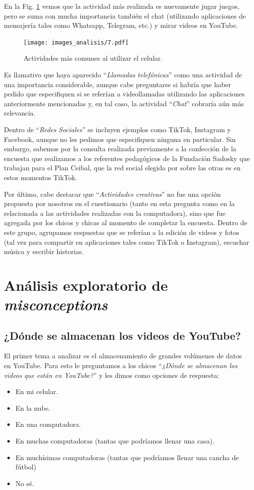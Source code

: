 En la Fig. \ref{fig:analisis7} vemos que la actividad más realizada es nuevamente jugar juegos, pero se suma con mucha importancia también el chat (utilizando aplicaciones de mensajería tales como Whatsapp, Telegram, etc.) y mirar videos en YouTube.

\begin{figure}[h]
    \centering
    \texttt{[image: images\_analisis/7.pdf]}
    \caption{Actividades más comunes al utilizar el celular.}
    \label{fig:analisis7}
\end{figure}


Es llamativo que haya aparecido ``\textit{Llamadas telefónicas}'' como una actividad de una importancia considerable, aunque cabe preguntarse si habría que haber pedido que especifiquen si se referían a videollamadas utilizando las aplicaciones anteriormente mencionadas y, en tal caso, la actividad ``\textit{Chat}'' cobraría aún más relevancia.

Dentro de ``\textit{Redes Sociales}'' se incluyen ejemplos como TikTok, Instagram y Facebook, aunque no les pedimos que especifiquen ninguna en particular. Sin embargo, sabemos por la consulta realizada previamente a la confección de la encuesta que realizamos a los referentes pedagógicos de la Fundación Sadosky que trabajan para el Plan Ceibal, que la red social elegida por sobre las otras es en estos momentos TikTok.

Por último, cabe destacar que ``\textit{Actividades creativas}'' no fue una opción propuesta por nosotros en el cuestionario (tanto en esta pregunta como en la relacionada a las actividades realizadas con la computadora), sino que fue agregada por los chicos y chicas al momento de completar la encuesta. Dentro de este grupo, agrupamos respuestas que se referían a la edición de videos y fotos (tal vez para compartir en aplicaciones tales como TikTok o Instagram), escuchar música y escribir historias.

\section{Análisis exploratorio de \textit{misconceptions}}

\subsection{¿Dónde se almacenan los videos de YouTube?}

El primer tema a analizar es el almacenamiento de grandes volúmenes de datos en YouTube. Para esto le preguntamos a los chicos ``\textit{¿Dónde se almacenan los videos que están en YouTube?}'' y les dimos como opciones de respuesta:
\begin{itemize}
    \item En mi celular.
    \item En la nube.
    \item En una computadora.
    \item En muchas computadoras (tantas que podríamos llenar una casa).
    \item En muchísimas computadoras (tantas que podríamos llenar una cancha de fútbol)
    \item No sé.
\end{itemize}


